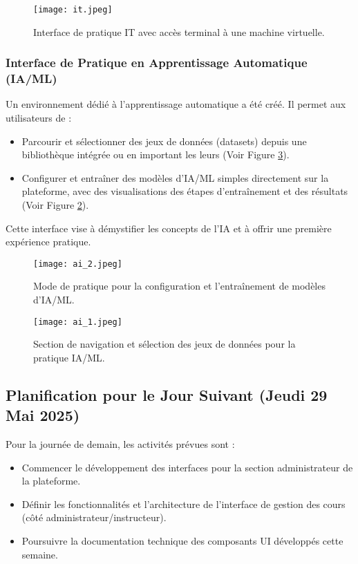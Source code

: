\documentclass[12pt, a4paper]{article}
\begin{document}
\begin{figure}[htbp]
  \centering
  \texttt{[image: it.jpeg]} %
  \caption{Interface de pratique IT avec accès terminal à une machine virtuelle.}
  \label{fig:it_practice}
\end{figure}

\subsubsection{Interface de Pratique en Apprentissage Automatique (IA/ML)}
Un environnement dédié à l'apprentissage automatique a été créé. Il permet aux utilisateurs de :
\begin{itemize}
    \item Parcourir et sélectionner des jeux de données (datasets) depuis une bibliothèque intégrée ou en important les leurs (Voir Figure \ref{fig:ml_datasets}).
    \item Configurer et entraîner des modèles d'IA/ML simples directement sur la plateforme, avec des visualisations des étapes d'entraînement et des résultats (Voir Figure \ref{fig:ml_training}).
\end{itemize}
Cette interface vise à démystifier les concepts de l'IA et à offrir une première expérience pratique.


\begin{figure}[htbp]
  \centering
  \texttt{[image: ai\_2.jpeg]} %
  \caption{Mode de pratique pour la configuration et l'entraînement de modèles d'IA/ML.}
  \label{fig:ml_training}
\end{figure}


\begin{figure}[htbp]
  \centering
  \texttt{[image: ai\_1.jpeg]} %
  \caption{Section de navigation et sélection des jeux de données pour la pratique IA/ML.}
  \label{fig:ml_datasets}
\end{figure}
\newpage

\subsection{Planification pour le Jour Suivant (Jeudi 29 Mai 2025)}

Pour la journée de demain, les activités prévues sont :
\begin{itemize}
  \item Commencer le développement des interfaces pour la section administrateur de la plateforme.
  \item Définir les fonctionnalités et l'architecture de l'interface de gestion des cours (côté administrateur/instructeur).
  \item Poursuivre la documentation technique des composants UI développés cette semaine.
\end{itemize}
\end{document}
